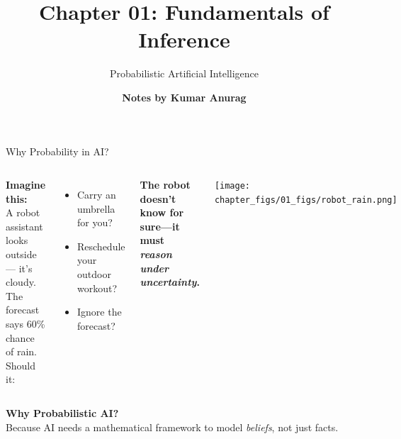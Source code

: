 \documentclass[handout,aspectratio=169]{beamer}
\title{
Chapter 01: Fundamentals of Inference
}
\author{\bf Notes by Kumar Anurag}
\date{}
\subtitle{
Probabilistic Artificial Intelligence
}
\begin{document}
{
	\begin{frame}
		\maketitle
	\end{frame}}



\begin{frame}{Why Probability in AI?}
	\begin{columns}
		\textbf{Imagine this:}\\[0.3em]
		A robot assistant looks outside — it's cloudy.  
		The forecast says 60\% chance of rain.\\[0.8em]
		Should it:\\
		\begin{itemize}
			\item Carry an umbrella for you?
			\item Reschedule your outdoor workout?
			\item Ignore the forecast?
		\end{itemize}
		
		\vspace{0.5em}
		\textbf{The robot doesn’t know for sure—it must \textit{reason under uncertainty}.}
		    
		\texttt{[image: chapter\_figs/01\_figs/robot\_rain.png]}
	\end{columns}
	
	\vspace{1em}
	\textbf{Why Probabilistic AI?} \\
	Because AI needs a mathematical framework to model \textit{beliefs}, not just facts.
\end{frame}
\end{document}

